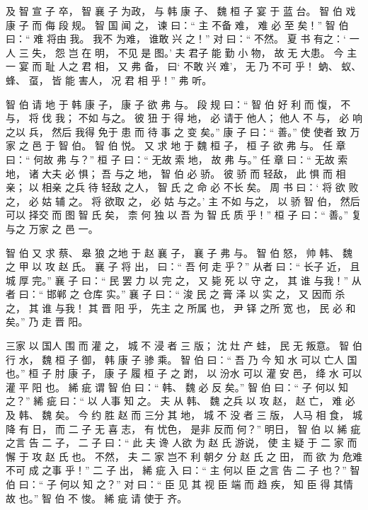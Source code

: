 \documentclass[UTF8,a4paper,8pt]{ctexbook}
\begin{document}
				  及 智 宣 子 卒， 智 襄 子 为政， 与 韩 康 子、 魏 桓 子 宴 于 蓝 台。 智 伯 戏 康 子 而 侮 段 规。 智 国 闻 之， 谏 曰：“ 主 不备 难， 难 必 至 矣！” 智 伯 曰：“ 难 将由 我。 我不 为难， 谁敢 兴 之！” 对 曰：“ 不然。 夏 书 有之：‘ 一人 三 失， 怨 岂 在 明， 不见 是 图。’ 夫 君子 能 勤 小 物， 故 无 大患。 今 主 一 宴 而 耻 人之 君 相， 又 弗 备， 曰‘ 不敢 兴 难’， 无 乃 不可 乎！ 蚋、 蚁、 蜂、 虿， 皆 能 害人， 况 君 相 乎！” 弗 听。 
				  
				  智 伯 请 地 于 韩 康 子， 康 子 欲 弗 与。 段 规 曰：“ 智 伯 好 利 而 愎， 不 与， 将 伐 我； 不如 与之。 彼 狃 于 得 地， 必 请于 他人； 他人 不 与， 必 响 之以 兵， 然后 我得 免于 患 而 待 事 之 变 矣。” 康 子 曰：“ 善。” 使 使者 致 万家 之 邑 于 智 伯。 智 伯 悦。 又 求 地 于 魏 桓 子， 桓 子 欲 弗 与。 任 章 曰：“ 何故 弗 与？” 桓 子 曰：“ 无故 索 地， 故 弗 与。” 任 章 曰：“ 无故 索 地， 诸 大夫 必 惧； 吾 与之 地， 智 伯 必 骄。 彼 骄 而 轻敌， 此 惧 而 相亲； 以 相亲 之兵 待 轻敌 之人， 智 氏 之 命 必 不长 矣。 周 书 曰：‘ 将 欲 败 之， 必 姑 辅 之。 将 欲取 之， 必 姑 与之。’ 主 不如 与之， 以 骄 智 伯， 然后 可以 择交 而 图 智 氏 矣， 柰 何 独 以 吾 为 智 氏 质 乎！” 桓 子 曰：“ 善。” 复 与之 万家 之 邑 一。 
				  
				  智 伯 又 求 蔡、 皋 狼 之地 于 赵 襄 子， 襄 子 弗 与。 智 伯 怒， 帅 韩、 魏 之 甲 以 攻 赵 氏。 襄 子 将 出， 曰：“ 吾 何 走 乎？” 从者 曰：“ 长子 近， 且 城 厚 完。” 襄 子 曰：“ 民 罢 力 以 完 之， 又 毙 死 以 守 之， 其 谁 与我！” 从者 曰：“ 邯郸 之 仓库 实。” 襄 子 曰：“ 浚 民 之 膏 泽 以 实 之， 又 因而 杀 之， 其 谁 与我！ 其 晋 阳 乎， 先主 之 所属 也， 尹 铎 之所 宽 也， 民 必 和 矣。” 乃 走 晋 阳。 
				  
				  三家 以 国人 围 而 灌 之， 城 不 浸 者 三 版； 沈 灶 产 蛙， 民 无 叛意。 智 伯 行 水， 魏 桓 子 御， 韩 康 子 骖 乘。 智 伯 曰：“ 吾 乃 今 知 水 可以 亡人 国 也。” 桓 子 肘 康 子， 康 子 履 桓 子 之 跗， 以 汾水 可以 灌 安 邑， 绛 水 可以 灌 平 阳 也。 絺 疵 谓 智 伯 曰：“ 韩、 魏 必 反 矣。” 智 伯 曰：“ 子 何以 知 之？” 絺 疵 曰：“ 以 人事 知 之。 夫 从 韩、 魏 之兵 以 攻 赵， 赵 亡， 难 必 及 韩、 魏 矣。 今 约 胜 赵 而 三分 其 地， 城 不 没 者 三 版， 人马 相 食， 城 降 有 日， 而 二 子 无 喜 志， 有 忧色， 是非 反而 何？” 明日， 智 伯 以 絺 疵 之言 告 二 子， 二 子 曰：“ 此 夫 谗 人欲 为 赵 氏 游说， 使 主 疑 于 二 家 而 懈 于 攻 赵 氏 也。 不然， 夫 二 家 岂不 利 朝夕 分 赵 氏 之 田， 而 欲 为 危难 不可 成 之事 乎！” 二 子 出， 絺 疵 入 曰：“ 主 何以 臣 之言 告 二 子 也？” 智 伯 曰：“ 子 何以 知 之？” 对 曰：“ 臣 见 其 视 臣 端 而 趋 疾， 知 臣 得 其情 故 也。” 智 伯 不 悛。 絺 疵 请 使于 齐。
				  
\end{document}

